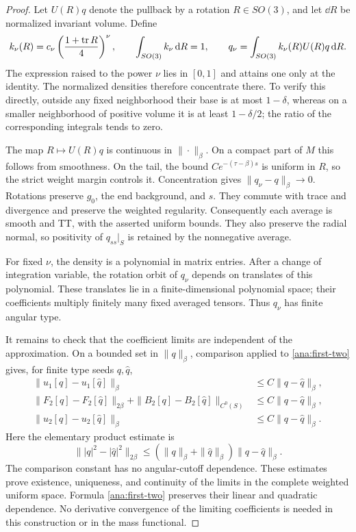 \begin{proof}
Let $U(R)q$ denote the pullback by a rotation $R\in SO(3)$, and
let $\dd R$ be normalized invariant volume.  Define
\[
 k_\nu(R)=c_\nu\left(\frac{1+\operatorname{tr} R}{4}\right)^\nu,
 \qquad \int_{SO(3)}k_\nu\,\mathrm{d} R=1,
 \qquad q_\nu=\int_{SO(3)}k_\nu(R)U(R)q\,\mathrm{d} R.
\]
The expression raised to the power $\nu$ lies in $[0,1]$ and attains
one only at the identity.  The normalized densities therefore
concentrate there.  To verify this directly, outside any fixed
neighborhood their base is at most $1-\delta$, whereas on a smaller
neighborhood of positive volume it is at least $1-\delta/2$;
the ratio of the corresponding integrals tends to zero.

The map $R\mapsto U(R)q$ is continuous in $\|\cdot\|_\beta$.
On a compact part of $M$ this follows from smoothness.  On the tail,
the bound $Ce^{-(\tau-\beta)s}$ is uniform in $R$, so the strict
weight margin controls it.  Concentration gives
$\|q_\nu-q\|_\beta\to0$.
Rotations preserve $g_0$, the end background, and $s$.  They commute
with trace and divergence and preserve the weighted regularity.
Consequently each average is smooth and TT, with the asserted uniform
bounds.  They also preserve the radial normal, so positivity of
$q_{ss}|_S$ is retained by the nonnegative average.

For fixed $\nu$, the density is a polynomial in matrix entries.
After a change of integration variable, the rotation orbit of $q_\nu$
depends on translates of this polynomial.  These translates lie in a
finite-dimensional polynomial space; their coefficients multiply
finitely many fixed averaged tensors.  Thus $q_\nu$ has finite angular
type.

It remains to check that the coefficient limits are independent of
the approximation.  On a bounded set in $\|q\|_\beta$, comparison
applied to \eqref{ana:first-two} gives, for finite type seeds $q,\hat q$,
\begin{align*}
 \|u_1[q]-u_1[\hat q]\|_\beta
     &\leq C\|q-\hat q\|_\beta,\\
 \|F_2[q]-F_2[\hat q]\|_{2\beta}
  +\|B_2[q]-B_2[\hat q]\|_{C^0(S)}
     &\leq C\|q-\hat q\|_\beta,\\
 \|u_2[q]-u_2[\hat q]\|_\beta
     &\leq C\|q-\hat q\|_\beta.
\end{align*}
Here the elementary product estimate is
\[
 \bigl\||q|^2-|\hat q|^2\bigr\|_{2\beta}
 \leq(\|q\|_\beta+\|\hat q\|_\beta)\|q-\hat q\|_\beta.
\]
The comparison constant has no angular-cutoff dependence.
These estimates prove existence, uniqueness, and continuity of the
limits in the complete weighted uniform space.  Formula
\eqref{ana:first-two} preserves their linear and quadratic dependence.
No derivative convergence of the limiting coefficients is needed in
this construction or in the mass functional.
\end{proof}

